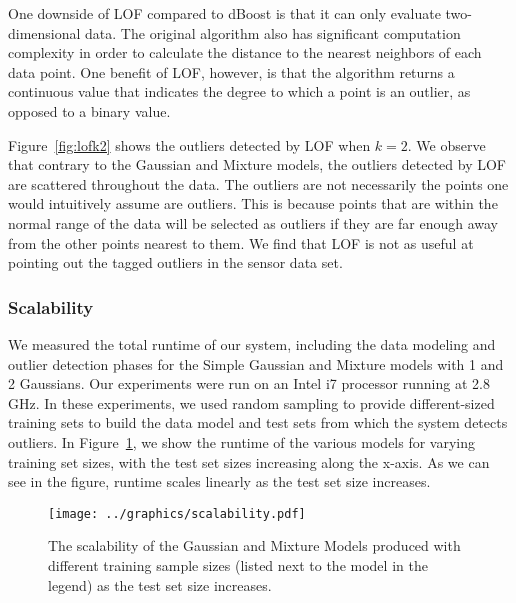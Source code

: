 One downside of LOF compared to dBoost is that it can only evaluate two-dimensional data.
The original algorithm also has significant computation complexity in order to calculate the distance to the nearest neighbors of each data point.
One benefit of LOF, however, is that the algorithm returns a continuous value that indicates the degree to which a point is an outlier, as opposed to a binary value.

Figure~\ref{fig:lofk2} shows the outliers detected by LOF when $k=2$.
We observe that contrary to the Gaussian and Mixture models, the outliers detected by LOF are scattered throughout the data.
The outliers are not necessarily the points one would intuitively assume are outliers.
This is because points that are within the normal range of the data will be selected as outliers if they are far enough away from the other points nearest to them.
We find that LOF is not as useful at pointing out the tagged outliers in the sensor data set.

\subsubsection{Scalability}

We measured the total runtime of our system, including the data modeling and outlier detection phases for the Simple Gaussian and Mixture models with 1 and 2 Gaussians.
Our experiments were run on an Intel i7 processor running at 2.8 GHz.
In these experiments, we used random sampling to provide different-sized training sets to build the data model and test sets from which the system detects outliers.
In Figure~\ref{fig:scaling}, we show the runtime of the various models for varying training set sizes, with the test set sizes increasing along the x-axis.
As we can see in the figure, runtime scales linearly as the test set size increases.

\begin{figure}
\centering
\texttt{[image: ../graphics/scalability.pdf]}
\caption{The scalability of the Gaussian and Mixture Models produced with different training sample sizes (listed next to the model in the legend) as the test set size increases.}
\label{fig:scaling}
\end{figure}
